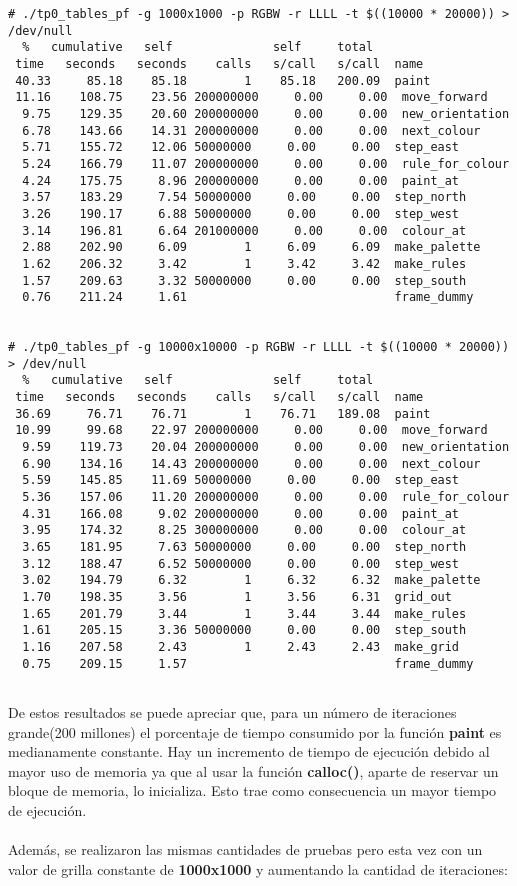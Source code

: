 \documentclass[a4paper, 10pt, twoside, notitlepage]{article}
\begin{document}
\begin{verbatim}
# ./tp0_tables_pf -g 1000x1000 -p RGBW -r LLLL -t $((10000 * 20000)) > /dev/null
  %   cumulative   self              self     total           
 time   seconds   seconds    calls   s/call   s/call  name    
 40.33     85.18    85.18        1    85.18   200.09  paint
 11.16    108.75    23.56 200000000     0.00     0.00  move_forward
  9.75    129.35    20.60 200000000     0.00     0.00  new_orientation
  6.78    143.66    14.31 200000000     0.00     0.00  next_colour
  5.71    155.72    12.06 50000000     0.00     0.00  step_east
  5.24    166.79    11.07 200000000     0.00     0.00  rule_for_colour
  4.24    175.75     8.96 200000000     0.00     0.00  paint_at
  3.57    183.29     7.54 50000000     0.00     0.00  step_north
  3.26    190.17     6.88 50000000     0.00     0.00  step_west
  3.14    196.81     6.64 201000000     0.00     0.00  colour_at
  2.88    202.90     6.09        1     6.09     6.09  make_palette
  1.62    206.32     3.42        1     3.42     3.42  make_rules
  1.57    209.63     3.32 50000000     0.00     0.00  step_south
  0.76    211.24     1.61                             frame_dummy


# ./tp0_tables_pf -g 10000x10000 -p RGBW -r LLLL -t $((10000 * 20000)) > /dev/null
  %   cumulative   self              self     total           
 time   seconds   seconds    calls   s/call   s/call  name    
 36.69     76.71    76.71        1    76.71   189.08  paint
 10.99     99.68    22.97 200000000     0.00     0.00  move_forward
  9.59    119.73    20.04 200000000     0.00     0.00  new_orientation
  6.90    134.16    14.43 200000000     0.00     0.00  next_colour
  5.59    145.85    11.69 50000000     0.00     0.00  step_east
  5.36    157.06    11.20 200000000     0.00     0.00  rule_for_colour
  4.31    166.08     9.02 200000000     0.00     0.00  paint_at
  3.95    174.32     8.25 300000000     0.00     0.00  colour_at
  3.65    181.95     7.63 50000000     0.00     0.00  step_north
  3.12    188.47     6.52 50000000     0.00     0.00  step_west
  3.02    194.79     6.32        1     6.32     6.32  make_palette
  1.70    198.35     3.56        1     3.56     6.31  grid_out
  1.65    201.79     3.44        1     3.44     3.44  make_rules
  1.61    205.15     3.36 50000000     0.00     0.00  step_south
  1.16    207.58     2.43        1     2.43     2.43  make_grid
  0.75    209.15     1.57                             frame_dummy


\end{verbatim}
\normalsize
De estos resultados se puede apreciar que, para un número de iteraciones grande(200 millones) el porcentaje de tiempo consumido por la función \textbf{paint} es medianamente constante. Hay un incremento de tiempo de ejecución debido al mayor uso de memoria ya que al usar la función \textbf{calloc()}, aparte de reservar un bloque de memoria, lo inicializa. Esto trae como consecuencia un mayor tiempo de ejecución.\\
\\
Además, se realizaron las mismas cantidades de pruebas pero esta vez con un valor de grilla constante de \textbf{1000x1000} y aumentando la cantidad de iteraciones:
\end{document}

